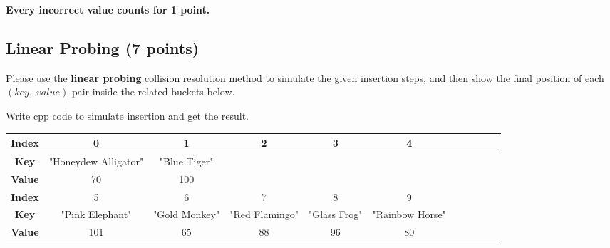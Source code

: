 \documentclass[11pt]{exam}
\begin{document}
\textbf{Every incorrect value counts for 1 point.}
\subsection{Linear Probing (7 points)}
Please use the \textbf{linear probing} collision resolution method to simulate the given insertion steps, and then show the final position of each $(key,\;value)$ pair inside the related buckets below.
\begin{solution}
    Write cpp code to simulate insertion and get the result.
    \begin{table}[H]
        \centering
        \footnotesize
        \renewcommand{\arraystretch}{2}
        \begin{tabular}{|c|c|c|c|c|c|c|c|c|c|c|}
            \hline
            \textbf{Index} & 0                    & 1             & 2              & 3            & 4               \\
            \hline
            \textbf{Key}   & "Honeydew Alligator" & "Blue Tiger"  &                &              &                 \\
            \hline
            \textbf{Value} & 70                   & 100           &                &              &                 \\
            \hline
            \textbf{Index} & 5                    & 6             & 7              & 8            & 9               \\
            \hline
            \textbf{Key}   & "Pink Elephant"      & "Gold Monkey" & "Red Flamingo" & "Glass Frog" & "Rainbow Horse" \\
            \hline
            \textbf{Value} & 101                  & 65            & 88             & 96           & 80              \\
            \hline
        \end{tabular}
    \end{table}
\end{solution}
\end{document}
